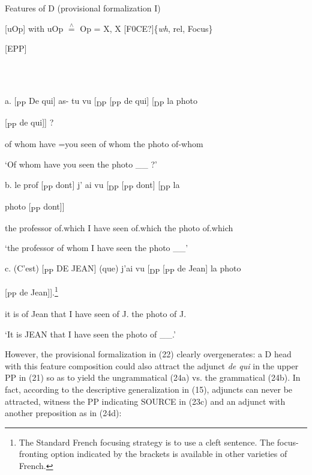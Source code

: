 \documentclass[output=paper]{langsci/langscibook}
\begin{document}
\ea%
    \label{ex:key:22}
    \gll\\
        \\
    \glt
    \z

           Features of D (provisional formalization I)

  [uOp]  with uOp $\stackrel{\wedge}{=}$ Op = X, X [F0CE?]\{\textit{wh}, rel, Focus\}

      {\textbar}

  [EPP]

\ea%
    \label{ex:key:23}
    \gll\\
        \\
    \glt
    \z

            a.   [\textsubscript{PP}  De qui]  as-    tu  vu [\textsubscript{DP} [\textsubscript{PP}  de qui] [\textsubscript{DP}   la  photo 

[\textsubscript{PP} de qui]] ?

      of whom  have  =you  seen    of whom  the  photo        of-whom

    ‘Of whom have you seen the photo \_\_ ?’

    b.   le  prof [\textsubscript{PP}  dont]    j’  ai  vu [\textsubscript{DP} [\textsubscript{PP}  dont] [\textsubscript{DP}  la   

photo  [\textsubscript{PP} dont]] 

     the  professor  of.which  I  have  seen    of.which  the      photo    of.which

    ‘the professor of whom I have seen the photo \_\_’

    c.   (C’est) [\textsubscript{PP} DE JEAN]   (que)  j’ai  vu   [\textsubscript{DP} [\textsubscript{PP} de Jean]  la  photo 

[\textsubscript{PP} de Jean]].\footnote{The Standard French focusing strategy is to use a cleft sentence. The focus-fronting option indicated by the brackets is available in other varieties of French.}

    it is   of  Jean    that  I have seen    of J.    the  photo      of J.

    ‘It is JEAN that I have seen the photo of \_\_.’

However, the provisional formalization in (22) clearly overgenerates: a D head with this feature composition could also attract the adjunct \textit{de qui} in the upper PP in (21) so as to yield the ungrammatical (24a) vs. the grammatical (24b). In fact, according to the descriptive generalization in (15), adjuncts can never be attracted, witness the PP indicating SOURCE in (23c) and an adjunct with another preposition as in (24d):
\end{document}
